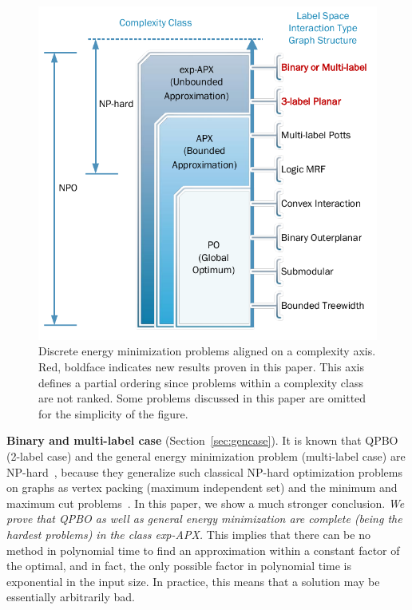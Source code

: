\begin{figure}
\begin{center}
   \includegraphics[width=0.6\linewidth]{figure/HardnessAxisBox1.pdf}
\end{center}
    \caption{Discrete energy minimization problems aligned on a complexity axis. Red, boldface indicates new results proven in this paper. This axis defines a partial ordering since problems within a complexity class are not ranked. Some problems discussed in this paper are omitted for the simplicity of the figure.}
\label{fig:hardnessaxis}
\end{figure}

\textbf{Binary and multi-label case}  (Section~\ref{sec:gencase}). It is known that QPBO (2-label case) and the general energy minimization problem (multi-label case) are NP-hard~\cite{BorosHammer02}, because they generalize such classical NP-hard optimization problems on graphs as vertex packing (maximum independent set) and the minimum and maximum cut problems~\cite{Karp-72}.
In this paper, we show a much stronger conclusion. \emph{We prove that QPBO as well as general energy minimization are complete (being the hardest problems) in the class exp-APX.} This implies that there can be no method in polynomial time to find an approximation within a constant factor of the optimal, and in fact, the only possible factor in polynomial time is exponential in the input size. %
In practice, this means that a solution may be essentially arbitrarily bad.


